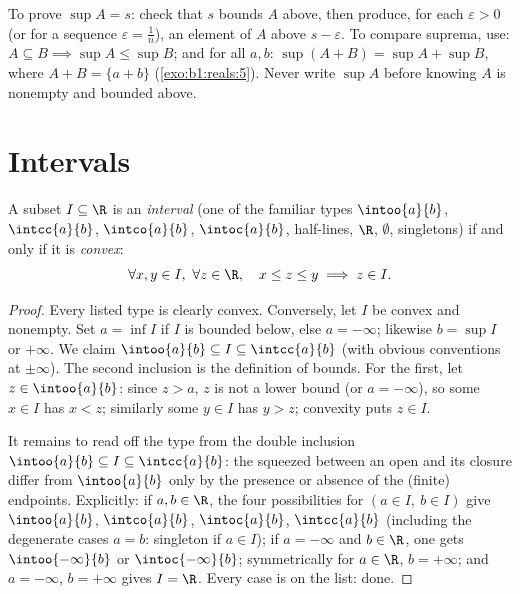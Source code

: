 \begin{method}\label{met:b1:reals:supproofs}
To prove $\sup A = s$: check that $s$ bounds $A$ above, then produce,
for each $\varepsilon > 0$ (or for a sequence $\varepsilon = \frac
1n$), an element of $A$ above $s - \varepsilon$. To compare suprema,
use: $A \subseteq B \implies \sup A \leq \sup B$; and for all $a, b$:
$\sup(A + B) = \sup A + \sup B$, where $A + B = \{a + b\}$
(\cref{exo:b1:reals:5}). Never write $\sup A$ before knowing $A$ is
nonempty and bounded above.
\end{method}

\section{Intervals}

\begin{proposition}\label{prop:b1:reals:intervals}
A subset $I \subseteq \R$ is an \emph{interval} (one
of the familiar types $\intoo{a}{b}$, $\intcc{a}{b}$, $\intco{a}{b}$,
$\intoc{a}{b}$, half-lines, $\R$, $\emptyset$, singletons) if and
only if it is \emph{convex}:
\[
\forall x, y \in I,\ \forall z \in \R, \quad
x \leq z \leq y \implies z \in I .
\]
\end{proposition}

\begin{proof}
Every listed type is clearly convex. Conversely, let $I$ be convex and
nonempty. Set $a = \inf I$ if $I$ is bounded below, else $a =
-\infty$; likewise $b = \sup I$ or $+\infty$. We claim $\intoo{a}{b}
\subseteq I \subseteq \intcc{a}{b}$ (with obvious conventions at
$\pm\infty$). The second inclusion is the definition of bounds. For
the first, let $z \in \intoo{a}{b}$: since $z > a$, $z$ is not a
lower bound (or $a = -\infty$), so some $x \in I$ has $x < z$;
similarly some $y \in I$ has $y > z$; convexity puts $z \in I$.

It remains to read off the type from the double inclusion
$\intoo{a}{b} \subseteq I \subseteq \intcc{a}{b}$: the 
squeezed between an open  and its closure differ from
$\intoo{a}{b}$ only by the presence or absence of the (finite)
endpoints. Explicitly: if $a, b \in \R$, the four possibilities
for $(a \in I,\ b \in I)$ give $\intoo{a}{b}$, $\intco{a}{b}$,
$\intoc{a}{b}$, $\intcc{a}{b}$ (including the degenerate cases
$a = b$: singleton if $a \in I$); if $a = -\infty$ and $b \in
\R$, one gets $\intoo{-\infty}{b}$ or $\intoc{-\infty}{b}$;
symmetrically for $a \in \R$, $b = +\infty$; and $a = -\infty$,
$b = +\infty$ gives $I = \R$. Every case is on the list: done.
\end{proof}

